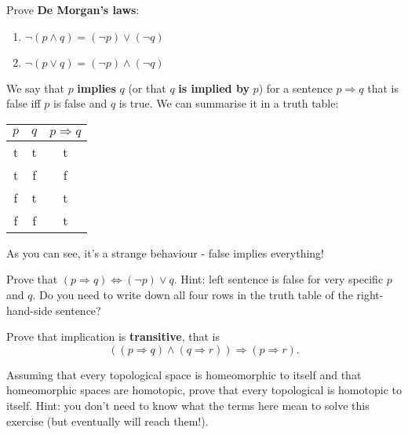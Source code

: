 \begin{exercise}
  Prove \textbf{De Morgan's laws}:
  \begin{enumerate}
    \item $\neg (p\wedge q) = (\neg p)\vee (\neg q)$
    \item $\neg (p\vee q) = (\neg p)\wedge (\neg q)$
  \end{enumerate}
\end{exercise}

\begin{definition}
  We say that $p$ \textbf{implies} $q$ (or that $q$ \textbf{is implied by} $p$) for a sentence $p\Rightarrow q$ that is false iff $p$ is false and $q$ is true.
  We can summarise it in a truth table:
  \begin{center}
    \begin{tabular}{ c  c  c }
      $p$ & $q$ & $p\Rightarrow q$ \\
      \hline
      t  &  t &        t     \\
      t  &  f &        f     \\
      f  &  t &        t     \\
      f  &  f &        t     \\
    \end{tabular}
  \end{center}
  As you can see, it's a strange behaviour - false implies everything!
\end{definition}

\begin{exercise}
  Prove that $(p\Rightarrow q)\Leftrightarrow (\neg p) \vee q$. Hint: left sentence is false for very specific $p$ and $q$. Do you need to write down all four rows in the truth table of the right-hand-side sentence?
\end{exercise}

\begin{exercise}
  Prove that implication is \textbf{transitive}, that is $$((p\Rightarrow q)\wedge (q\Rightarrow r)) \Rightarrow (p\Rightarrow r).$$
\end{exercise}

\begin{exercise}
  Assuming that every topological space is homeomorphic to itself and that homeomorphic spaces are homotopic, prove that every topological is homotopic to itself. Hint: you don't need to know what the terms here mean to solve this exercise (but eventually will reach them!).
\end{exercise}

